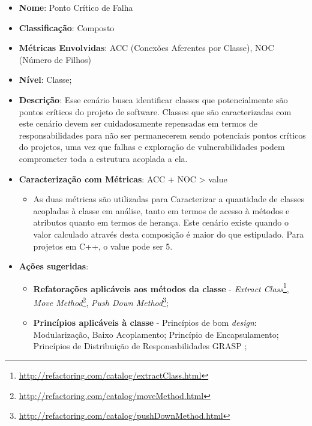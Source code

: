 \begin{itemize}
\item \textbf{Nome}: Ponto Crítico de Falha
\item \textbf{Classificação}: Composto
\item \textbf{Métricas Envolvidas}: ACC (Conexões Aferentes por Classe), NOC (Número de Filhos)
\item \textbf{Nível}: Classe;
\item \textbf{Descrição}: Esse cenário busca identificar classes que potencialmente são pontos críticos do projeto de software. Classes que são caracterizadas com este cenário devem ser cuidadosamente repensadas em termos de responsabilidades para não ser permanecerem sendo potenciais pontos críticos do projetos, uma vez que falhas e exploração de vulnerabilidades podem comprometer toda a estrutura acoplada a ela.
\item \textbf{Caracterização com Métricas}: ACC + NOC > value
	\begin{itemize}
	\item As duas métricas são utilizadas para Caracterizar a quantidade de classes acopladas à classe em análise, tanto em termos de acesso à métodos e atributos quanto em termos de herança. Este cenário existe quando o valor calculado através desta composição é maior do que estipulado. Para projetos em C++, o value pode ser 5.
	\end{itemize}
\item \textbf{Ações sugeridas}: 
	\begin{itemize}
	\item \textbf{Refatorações aplicáveis aos métodos da classe} - \emph{Extract Class}\footnote{\url{http://refactoring.com/catalog/extractClass.html}}, \emph{Move Method}\footnote{\url{http://refactoring.com/catalog/moveMethod.html}}, \emph{Push Down Method}\footnote{\url{http://refactoring.com/catalog/pushDownMethod.html}};
	\item \textbf{Princípios aplicáveis à classe} - Princípios de bom \emph{design}: Modularização, Baixo Acoplamento; Princípio de Encapsulamento; Princípios de Distribuição de Responsabilidades GRASP \cite{larman2007};
	\end{itemize}
\end{itemize}




